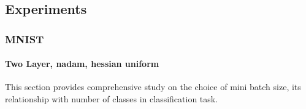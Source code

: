 \subsection{Experiments}

\subsubsection{MNIST}
\paragraph{Two Layer, nadam, hessian uniform}
\pgfplotstableclear{\dnwtwoptinit}
\pgfplotstableclear{\dnwfooptinit}
\pgfplotstableclear{\dnwsxoptinit}
\pgfplotstableclear{\dnwegoptinit}
\pgfplotstableclear{\dnwhnoptinit}
\pgfplotstableclear{\dnwhntwoptinit}

\noindent This section provides comprehensive study on the choice of mini batch size, its relationship with number of classes in classification task.
\dnwonoptinit
{}\dnwtwoptinit
{}\dnwfooptinit
{}\dnwsxoptinit
{}\dnwegoptinit
{}\dnwhntwoptinit

\providecommand{\initerr}{Error for initial epochs}
\providecommand{\initacc}{Accuracy for initial epcohs}
\providecommand{\lateerr}{Error for later epochs}
\providecommand{\lateacc}{Accuracy for later epochs}
\providecommand{\boxerr}{Error variation}
\providecommand{\boxacc}{Accuracy variation}

\providecommand{\initfigtitle}{Different batch results for starting 15 epochs }
\providecommand{\initcaption}{The initial epochs seen shows that 2x batch size(2x batch size=2*number of classes) started with the lowest error(a) as well as best accuracy(b), surprisingly 8x batch size started quite well inspite of less network updates in an epoch.
	Then till 15 epochs it is mixed results and no batch size cannot be singled out as a best performer.}

